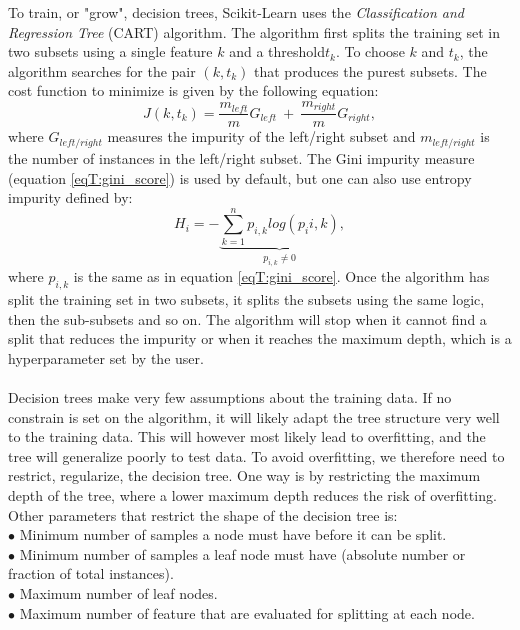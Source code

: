 \documentclass[12pt]{article}
\numberwithin{figure}{section}
\begin{document}
To train, or "grow", decision trees, Scikit-Learn uses the \textit{Classification and Regression Tree} (CART) algorithm. The algorithm first splits the training set in two subsets using a single feature $k$ and a threshold$t_k$. To choose $k$ and $t_k$, the algorithm searches for the pair $(k, t_k)$ that produces the purest subsets. The cost function to minimize is given by the following equation:
\begin{equation}
J(k,t_k) = \frac{m_{left}}{m}G_{left}\ +\ \frac{m_{right}}{m}G_{right},
\label{eqT:CART_cost}
\end{equation}
where $G_{left/right}$ measures the impurity of the left/right subset and $m_{left/right}$ is the number of instances in the left/right subset. The Gini impurity measure (equation \ref{eqT:gini_score}) is used by default, but one can also use entropy impurity defined by:
\begin{equation}
H_i = - \underbrace{\sum_{k=1}^{n} p_{i,k}log(p_i{i,k})}_{p_{i,k}\neq0},
\label{eqT:entropy_cost}
\end{equation}
where $p_{i,k}$ is the same as in equation \ref{eqT:gini_score}. Once the algorithm has split the training set in two subsets, it splits the subsets using the same logic, then the sub-subsets and so on. The algorithm will stop when it cannot find a split that reduces the impurity or when it reaches the maximum depth, which is a hyperparameter set by the user. \\ \\
Decision trees make very few assumptions about the training data. If no constrain is set on the algorithm, it will likely adapt the tree structure very well to the training data. This will however most likely lead to overfitting, and the tree will generalize poorly to test data. To avoid overfitting, we therefore need to restrict, regularize, the decision tree. One way is by restricting the maximum depth of the tree, where a lower maximum depth reduces the risk of overfitting. Other parameters that restrict the shape of the decision tree is:\\
$\bullet$ Minimum number of samples a node must have before it can be split.\\
$\bullet$ Minimum number of samples a leaf node must have (absolute number or fraction of total instances).\\
$\bullet$ Maximum number of leaf nodes.\\
$\bullet$ Maximum number of feature that are evaluated for splitting at each node.\\ \\
\end{document}
